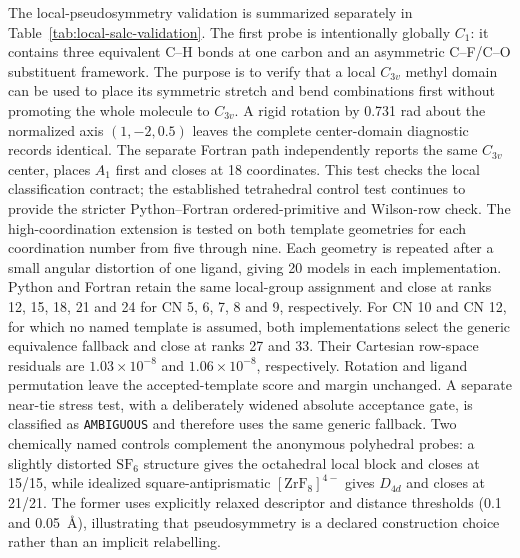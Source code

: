\documentclass[journal=jctcce,manuscript=article,layout=traditional]{achemso}
\theoremstyle{definition}
\begin{document}
The local-pseudosymmetry validation is summarized separately in
Table~\ref{tab:local-salc-validation}.  The first probe is intentionally
globally \(C_1\): it contains three equivalent C--H bonds at one carbon and an
asymmetric C--F/C--O substituent framework.  The purpose is to verify that a
local \(C_{3v}\) methyl domain can be used to place its symmetric stretch and
bend combinations first without promoting the whole molecule to \(C_{3v}\).
A rigid rotation by 0.731 rad about the normalized axis
\((1,-2,0.5)\) leaves the complete center-domain diagnostic records identical.
The separate Fortran path independently reports the same \(C_{3v}\) center,
places \(A_1\) first and closes at 18 coordinates.  This test checks the local
classification contract; the established tetrahedral control test continues
to provide the stricter Python--Fortran ordered-primitive and Wilson-row check.
The high-coordination extension is tested on both template geometries for each
coordination number from five through nine.  Each geometry is repeated after a
small angular distortion of one ligand, giving 20 models in each implementation.
Python and Fortran retain the same local-group assignment and close at ranks
12, 15, 18, 21 and 24 for CN 5, 6, 7, 8 and 9, respectively.
For CN 10 and CN 12, for which no named template is assumed, both
implementations select the generic equivalence fallback and close at ranks 27
and 33.  Their Cartesian row-space residuals are $1.03\times10^{-8}$ and
$1.06\times10^{-8}$, respectively.  Rotation and ligand permutation leave
the accepted-template score and margin unchanged.  A separate near-tie stress
test, with a deliberately widened absolute acceptance gate, is classified as
\texttt{AMBIGUOUS} and therefore uses the same generic fallback.
Two chemically named controls complement the anonymous polyhedral probes: a
slightly distorted \(\mathrm{SF_6}\) structure gives the octahedral local block
and closes at 15/15, while idealized square-antiprismatic
\([\mathrm{ZrF_8}]^{4-}\) gives \(D_{4d}\) and closes at 21/21.  The former uses
explicitly relaxed descriptor and distance thresholds (0.1 and 0.05~\AA),
illustrating that pseudosymmetry is a declared construction choice rather than
an implicit relabelling.
\end{document}
